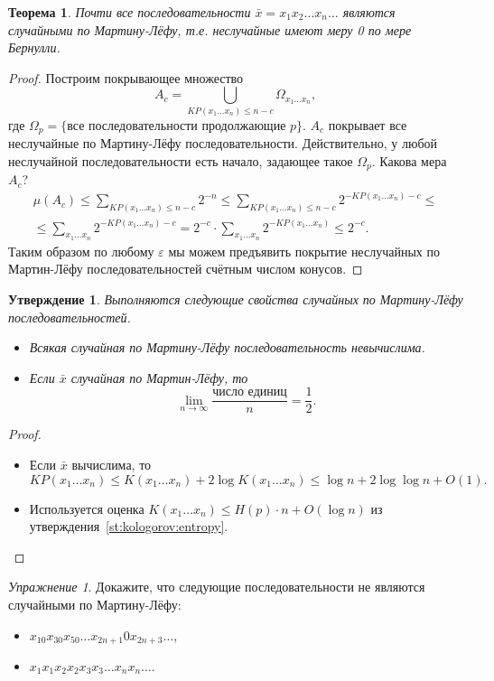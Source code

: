 \documentclass[12pt]{article}
\theoremstyle{definition}
\theoremstyle{plain}
\newtheorem{theorem}{Теорема}[section]
\newtheorem{statement}{Утверждение}[section]
\theoremstyle{remark}
\newtheorem{exercise}{Упражнение}[section]
\begin{document}
\begin{theorem}
    Почти все последовательности $\bar x = x_1x_2\dotso x_n\dotso$
    являются случайными по Мартину-Лёфу, т.е. неслучайные имеют меру 0 по мере
    Бернулли.
\end{theorem}
\begin{proof}
    Построим покрывающее множество
    \[
    A_c = \bigcup_{KP(x_1\dotso x_n)\le n-c}\Omega_{x_1\dotso x_n},
    \]
    где $\Omega_p = \{\text{все последовательности продолжающие $p$}\}$. $A_c$
    покрывает все неслучайные по Мартину-Лёфу последовательности. Действительно,
    у любой неслучайной последовательности есть начало, задающее такое
    $\Omega_p$. Какова мера $A_c$?
    \begin{multline*}
    \mu(A_c) \le 
    \sum_{KP(x_1\dotso x_n)\le n-c} 2^{-n} \le 
    \sum_{KP(x_1\dotso x_n)\le n-c} 2^{-KP(x_1\dotso x_n) - c} \le\\\le
    \sum_{x_1\dotso x_n} 2^{-KP(x_1\dotso x_n) - c} =
    2^{-c}\cdot \sum_{x_1\dotso x_n} 2^{-KP(x_1\dotso x_n)} \le 2^{-c}.
    \end{multline*}
    Таким образом по любому $\varepsilon$ мы можем предъявить покрытие
    неслучайных по Мартин-Лёфу последовательностей счётным числом конусов.
\end{proof}
\begin{statement}
    Выполняются следующие свойства случайных по Мартину-Лёфу последовательностей.
\begin{itemize}
    \item Всякая случайная по Мартину-Лёфу последовательность невычислима.
    \item Если $\bar x$ случайная по Мартин-Лёфу, то 
        \[
            \lim_{n\to\infty} \frac{\text{число единиц}}{n} = \frac12.
        \]
\end{itemize}
\end{statement}
\begin{proof}\mbox{}
\begin{itemize}
    \item Если $\bar x$ вычислима, то 
    \[
    KP(x_1\dotso x_n)\le K(x_1\dotso x_n) + 2\log
        K(x_1\dotso x_n) \le \log n + 2 \log \log n + O(1).
    \]
    \item Используется оценка $K(x_1\dots x_n) \le H(p)\cdot n + O(\log n)$ из
    утверждения~\ref{st:kologorov:entropy}.
\end{itemize}
\end{proof}

\begin{exercise}
    Докажите, что следующие последовательности не являются случайными по Мартину-Лёфу:
        \begin{itemize}
            \item $x_10x_30x_50\dotso x_{2n+1}0x_{2n+3}\dotso$,
            \item $x_1x_1x_2x_2x_3x_3\dotso x_{n}x_{n}\dotso$.
        \end{itemize}
\end{exercise}
\end{document}
